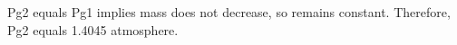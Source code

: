 Pg2 equals Pg1 implies mass does not decrease, so remains constant. Therefore, Pg2 equals 1.4045 atmosphere.